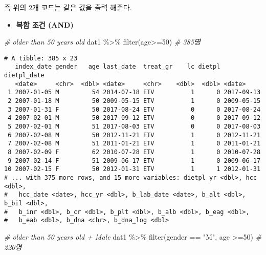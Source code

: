 \documentclass[
]{article}
\newenvironment{Shaded}{\begin{snugshade}}{\end{snugshade}}
\newcommand{\CommentTok}[1]{\textcolor[rgb]{0.56,0.35,0.01}{\textit{#1}}}
\newcommand{\DecValTok}[1]{\textcolor[rgb]{0.00,0.00,0.81}{#1}}
\newcommand{\FunctionTok}[1]{\textcolor[rgb]{0.00,0.00,0.00}{#1}}
\newcommand{\NormalTok}[1]{#1}
\newcommand{\SpecialCharTok}[1]{\textcolor[rgb]{0.00,0.00,0.00}{#1}}
\newcommand{\StringTok}[1]{\textcolor[rgb]{0.31,0.60,0.02}{#1}}
\providecommand{\tightlist}{%
  \setlength{\itemsep}{0pt}\setlength{\parskip}{0pt}}
\begin{document}
즉 위의 2개 코드는 같은 값을 출력 해준다.

\begin{itemize}
\tightlist
\item
  \textbf{복합 조건 (AND)}
\end{itemize}

\begin{Shaded}
\begin{Highlighting}[]
\CommentTok{\# older than 50 years old}
\NormalTok{dat1 }\SpecialCharTok{\%\textgreater{}\%} 
  \FunctionTok{filter}\NormalTok{(age}\SpecialCharTok{\textgreater{}=}\DecValTok{50}\NormalTok{) }\CommentTok{\# 385명}
\end{Highlighting}
\end{Shaded}

\begin{verbatim}
# A tibble: 385 x 23
   index_date gender   age last_date  treat_gr    lc dietpl dietpl_date
   <date>     <chr>  <dbl> <date>     <chr>    <dbl>  <dbl> <date>     
 1 2007-01-05 M         54 2014-07-18 ETV          1      0 2017-09-13 
 2 2007-01-18 M         50 2009-05-15 ETV          1      0 2009-05-15 
 3 2007-01-31 F         50 2017-08-24 ETV          0      0 2017-08-24 
 4 2007-02-01 M         50 2017-09-12 ETV          0      0 2017-09-12 
 5 2007-02-01 M         51 2017-08-03 ETV          0      0 2017-08-03 
 6 2007-02-08 M         50 2012-11-21 ETV          1      0 2012-11-21 
 7 2007-02-08 M         51 2011-01-21 ETV          1      0 2011-01-21 
 8 2007-02-09 F         62 2010-07-28 ETV          1      0 2010-07-28 
 9 2007-02-14 F         51 2009-06-17 ETV          1      0 2009-06-17 
10 2007-02-15 F         50 2012-01-31 ETV          1      1 2012-01-31 
# ... with 375 more rows, and 15 more variables: dietpl_yr <dbl>, hcc <dbl>,
#   hcc_date <date>, hcc_yr <dbl>, b_lab_date <date>, b_alt <dbl>, b_bil <dbl>,
#   b_inr <dbl>, b_cr <dbl>, b_plt <dbl>, b_alb <dbl>, b_eag <dbl>,
#   b_eab <dbl>, b_dna <chr>, b_dna_log <dbl>
\end{verbatim}

\begin{Shaded}
\begin{Highlighting}[]
\CommentTok{\# older than 50 years old + Male}
\NormalTok{dat1 }\SpecialCharTok{\%\textgreater{}\%} 
  \FunctionTok{filter}\NormalTok{(gender }\SpecialCharTok{==} \StringTok{"M"}\NormalTok{, age }\SpecialCharTok{\textgreater{}=}\DecValTok{50}\NormalTok{) }\CommentTok{\# 220명}
\end{Highlighting}
\end{Shaded}
\end{document}
